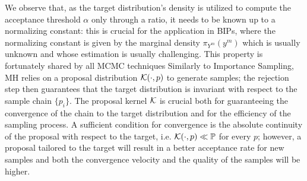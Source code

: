 We observe that, as the target distribution's density is utilized to compute the acceptance threshold $\alpha$ only through a ratio, it needs to be known up to a normalizing constant: this is crucial for the application in BIPs, where the normalizing constant is given by the marginal density $\pi_{Y^m}(y^m)$ which is usually unknown and whose estimation is usually challenging.
This property is fortunately shared by all MCMC techniques \newline
Similarly to Importance Sampling, MH relies on a proposal distribution $\mathcal K(\cdot, p)$ to generate samples; the rejection step then guarantees that the target distribution is invariant with respect to the sample chain $\{p_i\}$.
The proposal kernel $\mathcal K$ is crucial both for guaranteeing the convergence of the chain to the target distribution and for the efficiency of the sampling process. 
A sufficient condition for convergence is the absolute continuity of the proposal with respect to the target, i.e. $\mathcal K(\cdot, p) \ll \mathbb P $ for every $p$; however, a proposal tailored to the target will result in a better acceptance rate for new samples and both the convergence velocity and the quality of the samples will be higher. 


